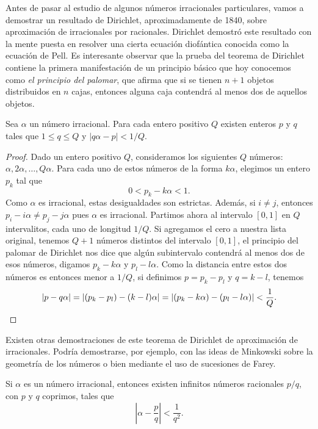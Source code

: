 Antes de pasar al estudio de algunos números irracionales particulares, vamos a
demostrar un resultado de Dirichlet, aproximadamente de 1840, sobre
aproximación de irracionales por racionales.  Dirichlet demostró este resultado
con la mente puesta en resolver una cierta ecuación diofántica conocida como la
ecuación de Pell. Es interesante observar que la prueba del teorema de
Dirichlet contiene la primera manifestación de un principio básico que hoy
conocemos como \emph{el principio del palomar}, que afirma que si se tienen 
$n+1$ objetos distribuidos en $n$ cajas, entonces alguna caja contendrá al
menos dos de aquellos objetos.

\begin{theorem}[Dirichlet]
	Sea $\alpha$ un número irracional. Para cada entero positivo $Q$ existen
	enteros $p$ y $q$ tales que $1\leq q\leq Q$ y $|q\alpha-p|<1/Q$. 
\end{theorem}

\begin{proof}
	Dado un entero positivo $Q$, consideramos los siguientes $Q$ números:
	$\alpha,2\alpha,\dots,Q\alpha$. Para cada uno de estos números de la
	forma $k\alpha$, elegimos un entero $p_k$ tal que 
	\[
		0<p_k-k\alpha<1.
	\]
	Como $\alpha$ es irracional, estas desigualdades son estrictas. Además, si
	$i\ne j$, entonces $p_i-i\alpha\ne p_j-j\alpha$ pues $\alpha$ es
	irracional. Partimos ahora al intervalo $[0,1]$ en $Q$ intervalitos, cada
	uno de longitud $1/Q$. Si agregamos el cero a nuestra lista original,
	tenemos $Q+1$ números distintos del intervalo $[0,1]$, el principio del
	palomar de Dirichlet nos dice que algún subintervalo contendrá al menos dos
	de esos números, digamos $p_k-k\alpha$ y $p_l-l\alpha$. Como la distancia
	entre estos dos números es entonces menor a $1/Q$, si definimos $p=p_k-p_l$
	y $q=k-l$, tenemos 
	\[
		|p-q\alpha|=|(p_k-p_l)-(k-l)\alpha|=|(p_k-k\alpha)-(p_l-l\alpha)|<\frac1{Q}.\qedhere
	\]
\end{proof}

Existen otras demostraciones de este teorema de Dirichlet de aproximación de
irracionales. Podría demostrarse, por ejemplo, con las ideas de Minkowski sobre
la geometría de los números o bien mediante el uso de sucesiones de Farey.

\begin{corollary}
	Si $\alpha$ es un número irracional, entonces existen infinitos números
	racionales $p/q$, con $p$ y $q$ coprimos, tales que 
	\[
		\left|\alpha-\frac{p}{q}\right|<\frac{1}{q^2}.
	\]
\end{corollary}

